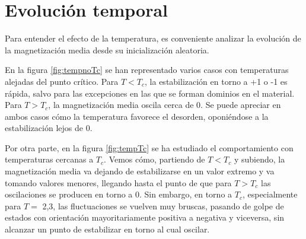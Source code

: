 \documentclass{scrartcl}
\begin{document}
\section{Evolución temporal}
Para entender el efecto de la temperatura, es conveniente analizar la evolución de la magnetización media desde su inicialización aleatoria.\par
En la figura \ref{fig:tempnoTc} se han representado varios casos con temperaturas alejadas del punto crítico. Para $T<T_c$, la estabilización en torno a +1 o -1 es rápida, salvo para las excepciones en las que se forman dominios en el material. Para $T>T_c$, la magnetización media oscila cerca de 0. Se puede apreciar en ambos casos cómo la temperatura favorece el desorden, oponiéndose a la estabilización lejos de 0.\par
Por otra parte, en la figura \ref{fig:tempTc} se ha estudiado el comportamiento con temperaturas cercanas a $T_c$. Vemos cómo, partiendo de $T<T_c$ y subiendo, la magnetización media va dejando de estabilizarse en un valor extremo y va tomando valores menores, llegando hasta el punto de que para $T>T_c$ las oscilaciones se producen en torno a 0. Sin embargo, en torno a $T_c$, especialmente para $T=$ 2,3, las fluctuaciones se vuelven muy bruscas, pasando de golpe de estados con orientación mayoritariamente positiva a negativa y viceversa, sin alcanzar un punto de estabilizar en torno al cual oscilar.
\end{document}
